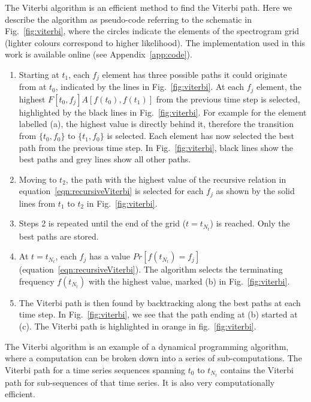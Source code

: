 \documentclass[paper-main.tex]{subfiles}
\begin{document}
The Viterbi algorithm is an efficient method to find the Viterbi path. 
Here we describe the algorithm as pseudo-code referring to the schematic in Fig.~\ref{fig:viterbi}, where the circles indicate the elements of the spectrogram grid (lighter colours correspond to higher likelihood). 
The implementation used in this work is available online (see Appendix~\ref{app:code}).
\begin{enumerate}
\item Starting at $t_1$, each $f_j$ element has three possible paths it could originate from at $t_0$, indicated by the lines in Fig.~\ref{fig:viterbi}. 
At each $f_j$ element, the highest $F[t_0,f_j] A[f(t_0),f(t_1)]$ from the previous time step is selected, highlighted by the black lines in Fig.~\ref{fig:viterbi}. 
For example for the element labelled (a), the highest value is directly behind it, therefore the transition from $\{t_0,f_0\}$ to $\{t_1,f_0\}$ is selected. 
Each element has now selected the best path from the previous time step. 
In Fig.~\ref{fig:viterbi}, black lines show the best paths and grey lines show all other paths. 

\item Moving to $t_2$, the path with the highest value of the recursive relation in equation~\ref{eqn:recursiveViterbi} is selected for each $f_j$ as shown by the solid lines from $t_1$ to $t_2$ in Fig.~\ref{fig:viterbi}. 

\item Steps 2 is repeated until the end of the grid ($t=t_{N_t}$) is reached. 
Only the best paths are stored. 

\item At $t=t_{N_t}$, each $f_j$ has a value $Pr[f(t_{N_t})=f_j]$ (equation~\ref{eqn:recursiveViterbi}). 
The algorithm selects the terminating frequency $f(t_{N_t})$ with the highest value, marked (b) in Fig.~\ref{fig:viterbi}.

\item The Viterbi path is then found by backtracking along the best paths at each time step.
In Fig.~\ref{fig:viterbi}, we see that the path ending at (b) started at (c). 
The Viterbi path is highlighted in orange in fig.~\ref{fig:viterbi}.
\end{enumerate}
The Viterbi algorithm is an example of a dynamical programming algorithm, where a computation can be broken down into a series of sub-computations.
The Viterbi path for a time series sequences spanning $t_0$ to $t_{N_t}$ contains the Viterbi path for sub-sequences of that time series. 
It is also very computationally efficient. 
\end{document}
